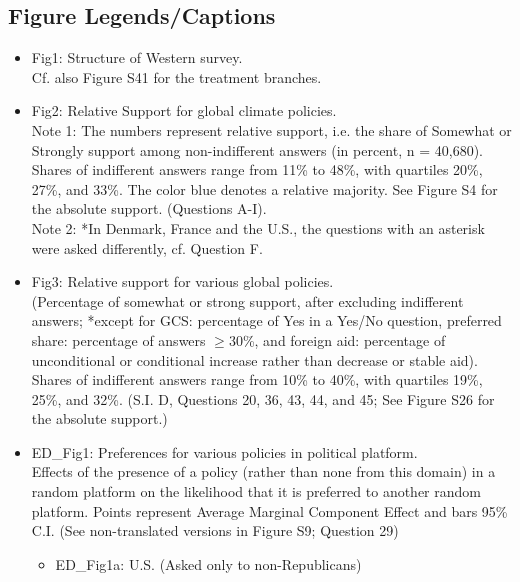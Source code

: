\subsection*{Figure Legends/Captions}

\begin{itemize}
  \item Fig1: Structure of Western survey.\\ Cf. also Figure S41 for the treatment branches.
  \item Fig2: Relative Support for global climate policies. \\
  Note 1: The numbers represent relative support, i.e. the share of Somewhat or Strongly support among non-indifferent answers (in percent, n = 40,680). Shares of indifferent answers range from 11\% to 48\%, with quartiles 20\%, 27\%, and 33\%. The color blue denotes a relative majority. See Figure S4 for the absolute support. (Questions A-I).\\
  Note 2: *In Denmark, France and the U.S., the questions with an asterisk were asked differently, cf. Question F.
  \item Fig3: Relative support for various global policies.\\ (Percentage of somewhat or strong support, after excluding indifferent answers; *except for GCS: percentage of Yes in a Yes/No question, preferred share: percentage of answers $\geq$30\%, and foreign aid: percentage of  unconditional or conditional increase rather than decrease or stable aid). Shares of indifferent answers range from 10\% to 40\%, with quartiles 19\%, 25\%, and 32\%. (S.I. D, %
  Questions 20, 36, 43, 44, and 45; See Figure S26 for the absolute support.)
  \item ED\_Fig1: Preferences for various policies in political platform. \\Effects of the presence of a policy (rather than none from this domain) in a random platform on the likelihood that it is preferred to another random platform. Points represent Average Marginal Component Effect and bars 95\% C.I. (See non-translated versions in Figure S9; Question 29)
  \begin{itemize}
    \item ED\_Fig1a: U.S. (Asked only to non-Republicans)

\end{itemize}
\end{itemize}
